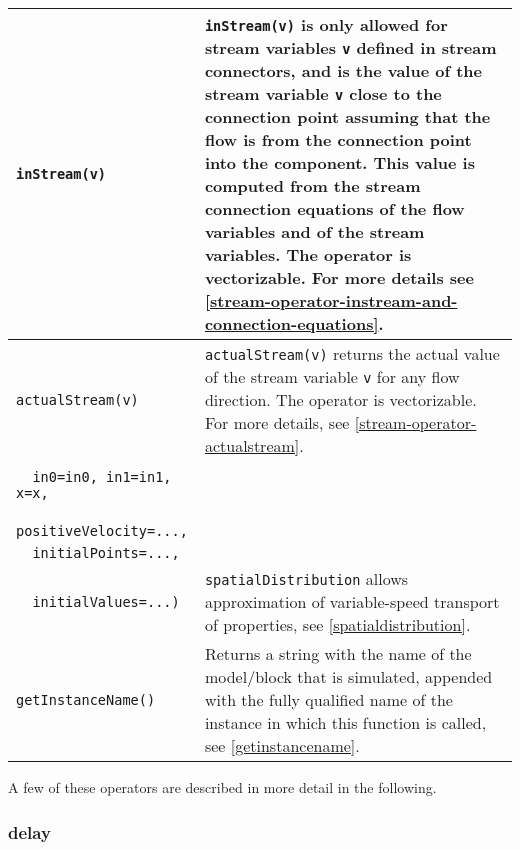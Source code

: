 \begin{longtable}{|p{5.1cm}|p{8cm}|}
\lstinline!inStream(v)! & \lstinline!inStream(v)! is only allowed for stream
variables \lstinline!v! defined in stream connectors, and is the value of the stream
variable \lstinline!v! close to the connection point assuming that the flow is from
the connection point into the component. This value is computed from the
stream connection equations of the flow variables and of the stream
variables. The operator is vectorizable. For more details see \autoref{stream-operator-instream-and-connection-equations}.\\
\hline

\lstinline!actualStream(v)! & \lstinline!actualStream(v)! returns the actual value
of the stream variable \lstinline!v! for any flow direction. The operator is
vectorizable. For more details, see \autoref{stream-operator-actualstream}.\\
\hline

\begin{tabular}{@{}p{5.1cm}@{}}
\lstinline!spatialDistribution(!\\
\lstinline!  in0=in0, in1=in1, x=x,!\\
\lstinline!  positiveVelocity=...,!\\
\lstinline!  initialPoints=...,!\\
\lstinline!  initialValues=...)!
\end{tabular} &
\lstinline!spatialDistribution! allows approximation of variable-speed transport of properties, see \autoref{spatialdistribution}.\\
\hline

\lstinline!getInstanceName()! & Returns a string with the name of the model/block
that is simulated, appended with the fully qualified name of the
instance in which this function is called, see \autoref{getinstancename}.\\
\hline
\end{longtable}

A few of these operators are described in more detail in the following.

\subsubsection{delay}

